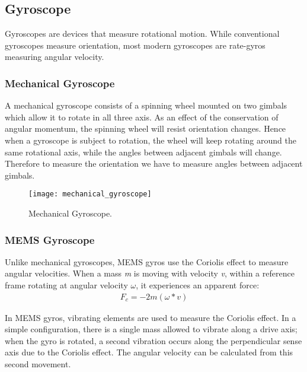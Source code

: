 \subsection{Gyroscope}

Gyroscopes are devices that measure rotational motion. While conventional gyroscopes measure orientation, most modern gyroscopes are rate-gyros measuring angular velocity.\\
\subsubsection{Mechanical Gyroscope}

A mechanical gyroscope consists of a spinning wheel mounted on two gimbals which allow it to rotate in all three axis. As an effect of the conservation of angular momentum, the spinning wheel will resist orientation changes. Hence when a gyroscope is subject to rotation, the wheel will keep rotating around the same rotational axis, while the angles between adjacent gimbals will change. Therefore to measure the orientation we have to measure angles between adjacent gimbals.\\
\begin{figure}[!ht]
	\texttt{[image: mechanical\_gyroscope]}
	\captionsetup{justification=centering, margin=1.5cm}
	\centering
	\caption{Mechanical Gyroscope.}
	\centering
\end{figure}

\subsubsection{MEMS Gyroscope}

Unlike mechanical gyroscopes, MEMS gyros use the Coriolis effect to measure angular velocities. When a mass \textit{m} is moving with velocity \textit{v}, within a reference frame rotating at angular velocity \textit{$\omega$}, it experiences an apparent force:
\begin{gather*}
	F_c = -2m(\omega*v)
\end{gather*}

In MEMS gyros, vibrating elements are used to measure the Coriolis effect. In a simple configuration, there is a single mass allowed to vibrate along a drive axis; when the gyro is rotated, a second vibration occurs along the perpendicular sense axis due to the Coriolis effect. The angular velocity can be calculated from this second movement.



